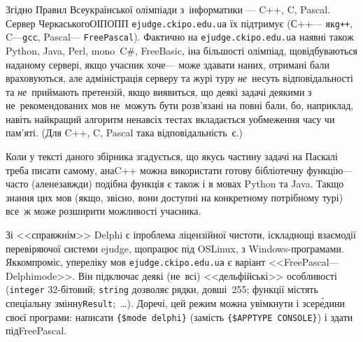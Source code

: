 \documentclass[14pt,a4paper]{extarticle}
\begin{document}
Згідно Правил Всеукраїнської олімпіади з~інформатики --- C++, C, Pascal. Сервер Черкаського\nolinebreak[2] ОІПОПП \verb"ejudge.ckipo.edu.ua" їх підтримує (С++\nolinebreak[2] --- як\nolinebreak[3] \verb"g++", C\nolinebreak[3] ---\nolinebreak[2] \verb"gcc", Pascal\nolinebreak[3] --- \texttt{Free\nolinebreak[1] Pascal}). Фактично на \verb"ejudge.ckipo.edu.ua" наявні також Python, Java, Perl, mono~C\#, Free\nolinebreak[1] Basic, і\nolinebreak[3] на більшості олімпіад, що\nolinebreak[3] відбуваються на\nolinebreak[3] даному сервері, якщо учасник хоче\nolinebreak[3] --- може здавати на\nolinebreak[3] них, отримані бали враховуються, але адміністрація серверу та журі туру \emph{не}~несуть відповідальності та \emph{не}~приймають претензій, якщо виявиться, що деякі задачі деякими з не~рекомендованих мов не~можуть бути розв'язані на повні бали, бо, наприклад, навіть найкращий алгоритм не\nolinebreak[3] на\nolinebreak[3] всіх тестах вкладається у\nolinebreak[3] обмеження часу чи пам'яті. (Для C++, C, Pascal така відповідальність~є.)

Коли у тексті даного збірника згадується, що якусь частину задачі на Паскалі треба писати самому, а\nolinebreak[3] на\nolinebreak[3] C++ можна використати готову бібліотечну функцію\nolinebreak[3] --- часто (але\nolinebreak[3] не\nolinebreak[3] завжди) подібна функція є також і в мовах Python та Java. Так\nolinebreak[3] що знання цих мов (якщо, звісно, вони доступні на конкретному потрібному турі) все~ж може розширити можливості учасника.

\label{text:notes-about-delphi-mode} Зі <<справжнім>> Delphi є і\nolinebreak[3] проблема ліцензійної чистоти, і\nolinebreak[3] складнощі взаємодії  перевіряючої системи ejudge, що\nolinebreak[1] працює під OS\nolinebreak[3] Linux, з Windows-програмами.
Як\nolinebreak[3] компроміс, у\nolinebreak[3] переліку мов \verb"ejudge."\linebreak[0]\verb"ckipo."\linebreak[1]\verb"edu.ua" є варіант <<Free\nolinebreak[1] Pascal\nolinebreak[3] --- Delphi\nolinebreak[1] mode>>. Він підключає деякі (не~всі) <<дельфійські>> особливості (\verb"integer" 32-бітовий; \verb"string" дозволяє рядки, довші~255; функції містять спеціальну змінну\nolinebreak[2] \verb"Result";~\dots). До\nolinebreak[3] речі, цей режим %
можна увімкнути і зсер\'{е}\-дини своєї програми: написати \verb"{$mode delphi}" (замість \verb"{$APPTYPE CONSOLE}") і здати під\nolinebreak[1] Free\nolinebreak[1] Pascal.
\end{document}

